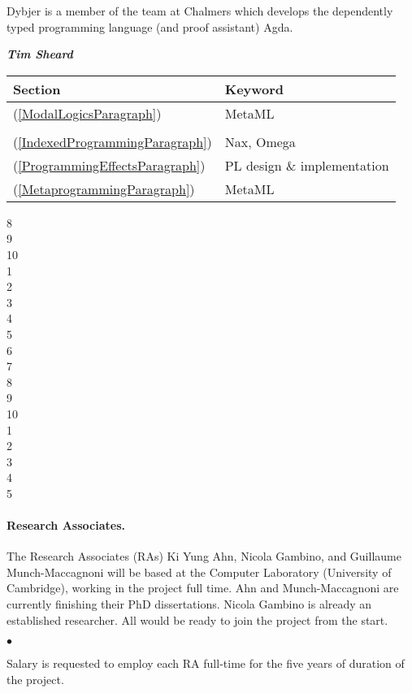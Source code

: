 \documentclass[11pt,twocolumn]{article}
\newenvironment{myitemize}
  {\begin{list}{$\bullet$}
  {\setlength{\topsep}{2pt}
   \setlength{\partopsep}{2pt}
   \setlength{\itemsep}{2.5pt}
   \setlength{\parsep}{2.5pt}
   \setlength{\leftmargin}{1em}
   \setlength{\labelwidth}{.5em}}}
  {\end{list}}
\begin{document}
Dybjer is a member of the team at Chalmers which develops the dependently
typed programming language (and proof assistant) Agda.  


\smallskip\noindent
\textbf{\em Tim Sheard} 

{\color{red}\begin{tabular}{l|l}
Section & Keyword
\\\hline
(\ref{ModalLogicsParagraph}) & MetaML
\\
\\
(\ref{IndexedProgrammingParagraph}) & Nax, Omega
\\
(\ref{ProgrammingEffectsParagraph}) & PL design \& implementation
\\
(\ref{MetaprogrammingParagraph}) & MetaML
\\
\end{tabular}

8\\9\\10\\
1\\2\\3\\4\\5\\6\\7\\8\\9\\10\\
1\\2\\3\\4\\5
}

\paragraph*{Research Associates.}

The Research Associates (RAs) Ki Yung Ahn, Nicola Gambino, and Guillaume
Munch-Maccagnoni will be based at the Computer Laboratory (University of
Cambridge), working in the project full time.  Ahn and Munch-Maccagnoni are
currently finishing their PhD dissertations.  Nicola Gambino is already an
established researcher.  All would be ready to join the project from the
start.  
\begin{myitemize}
\item 
  Salary is requested to employ each RA full-time for the five years of
  duration of the project.
\end{myitemize}
\end{document}
